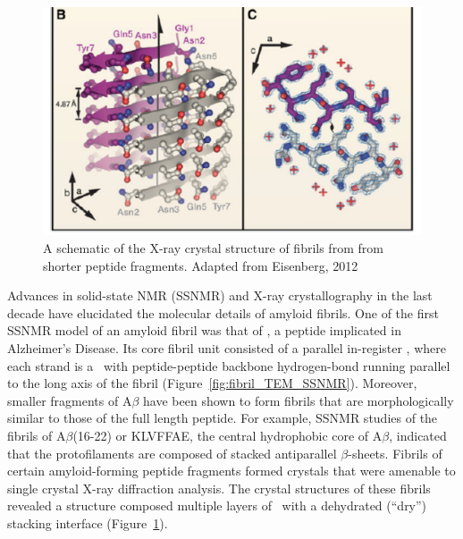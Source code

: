 \begin{figure}
 \centering
 \includegraphics[width=6in]{figures/introduction/fibril_xray_model.pdf}
 \caption[X-ray crystal structure of an amyloid fibril]{A schematic of the X-ray crystal structure of fibrils from from shorter peptide fragments. Adapted from Eisenberg, 2012}
 \label{fig:fibril_xray_model}
\end{figure}


Advances in solid-state NMR (SSNMR) and X-ray crystallography in the last decade have elucidated the molecular details of amyloid fibrils. One of the first SSNMR model of an amyloid fibril was that of , a peptide implicated in Alzheimer's Disease.\cite{Petkova:2006gx}
Its core fibril unit consisted of a parallel in-register \bsheet, where each strand is a \bhairpin\ with peptide-peptide backbone hydrogen-bond running parallel to the long axis of the fibril (Figure~\ref{fig:fibril_TEM_SSNMR}).  Moreover, smaller fragments of A$\beta$ have been shown to form fibrils that are morphologically similar to those of the full length peptide. For example, SSNMR studies of the fibrils of A$\beta$(16-22) or KLVFFAE, the central hydrophobic core of A$\beta$, indicated that the protofilaments are composed of stacked antiparallel $\beta$-sheets.\cite{Balbach:2000vf} Fibrils of certain amyloid-forming peptide fragments formed crystals that were amenable to single crystal X-ray diffraction analysis.\cite{Eisenberg:2012hm}  The crystal structures of these fibrils revealed a structure composed multiple layers of \bsheet\ with a dehydrated (``dry'') stacking interface (Figure~\ref{fig:fibril_xray_model}).\cite{Sawaya:2007p4363,Eisenberg:2012hm}

